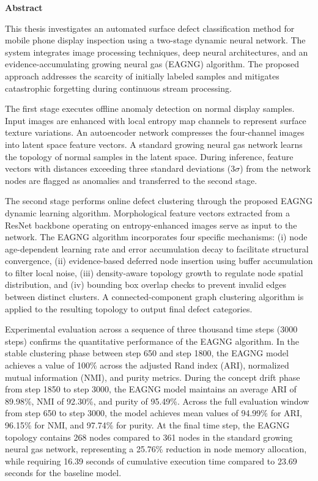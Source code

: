 \begin{center}
\textbf{\large{Abstract}}
\end{center}


\begin{small}

This thesis investigates an automated surface defect classification method for mobile phone display inspection using a two-stage dynamic neural network. The system integrates image processing techniques, deep neural architectures, and an evidence-accumulating growing neural gas (EAGNG) algorithm. The proposed approach addresses the scarcity of initially labeled samples and mitigates catastrophic forgetting during continuous stream processing.

The first stage executes offline anomaly detection on normal display samples. Input images are enhanced with local entropy map channels to represent surface texture variations. An autoencoder network compresses the four-channel images into latent space feature vectors. A standard growing neural gas network learns the topology of normal samples in the latent space. During inference, feature vectors with distances exceeding three standard deviations ($3\sigma$) from the network nodes are flagged as anomalies and transferred to the second stage.

The second stage performs online defect clustering through the proposed EAGNG dynamic learning algorithm. Morphological feature vectors extracted from a ResNet backbone operating on entropy-enhanced images serve as input to the network. The EAGNG algorithm incorporates four specific mechanisms: (i) node age-dependent learning rate and error accumulation decay to facilitate structural convergence, (ii) evidence-based deferred node insertion using buffer accumulation to filter local noise, (iii) density-aware topology growth to regulate node spatial distribution, and (iv) bounding box overlap checks to prevent invalid edges between distinct clusters. A connected-component graph clustering algorithm is applied to the resulting topology to output final defect categories.

Experimental evaluation across a sequence of three thousand time steps (3000 steps) confirms the quantitative performance of the EAGNG algorithm. In the stable clustering phase between step 650 and step 1800, the EAGNG model achieves a value of 100\% across the adjusted Rand index (ARI), normalized mutual information (NMI), and purity metrics. During the concept drift phase from step 1850 to step 3000, the EAGNG model maintains an average ARI of 89.98\%, NMI of 92.30\%, and purity of 95.49\%. Across the full evaluation window from step 650 to step 3000, the model achieves mean values of 94.99\% for ARI, 96.15\% for NMI, and 97.74\% for purity. At the final time step, the EAGNG topology contains 268 nodes compared to 361 nodes in the standard growing neural gas network, representing a 25.76\% reduction in node memory allocation, while requiring 16.39 seconds of cumulative execution time compared to 23.69 seconds for the baseline model.


\end{small}
